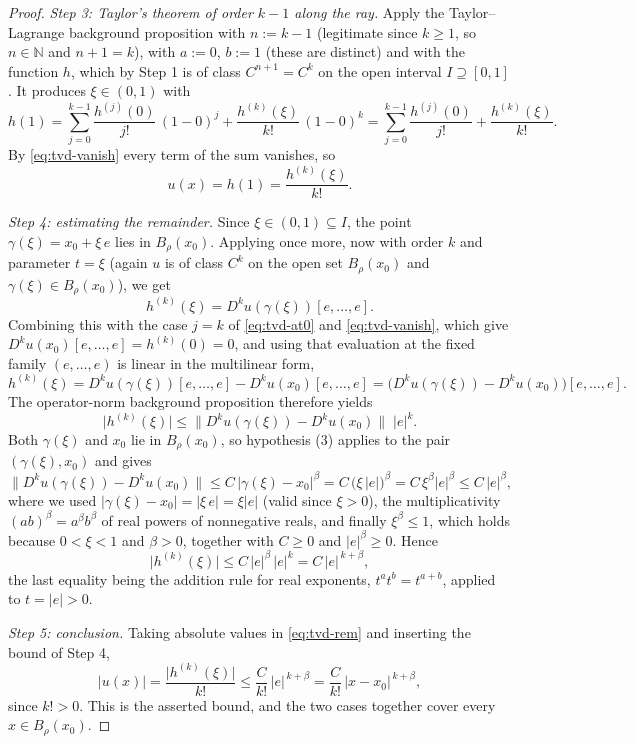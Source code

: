 \begin{proof}
\emph{Step 3: Taylor's theorem of order $k-1$ along the ray.}
Apply the Taylor--Lagrange background proposition with $n:=k-1$ (legitimate since $k\ge1$, so
$n\in\mathbb{N}$ and $n+1=k$), with $a:=0$, $b:=1$ (these are distinct) and with the function
$h$, which by Step 1 is of class $C^{n+1}=C^{k}$ on the open interval $I\supseteq[0,1]$.  It
produces $\xi\in(0,1)$ with
\[
  h(1)=\sum_{j=0}^{k-1}\frac{h^{(j)}(0)}{j!}\,(1-0)^{j}
       +\frac{h^{(k)}(\xi)}{k!}\,(1-0)^{k}
      =\sum_{j=0}^{k-1}\frac{h^{(j)}(0)}{j!}+\frac{h^{(k)}(\xi)}{k!} .
\]
By \eqref{eq:tvd-vanish} every term of the sum vanishes, so
\begin{equation}\label{eq:tvd-rem}
  u(x)=h(1)=\frac{h^{(k)}(\xi)}{k!} .
\end{equation}

\emph{Step 4: estimating the remainder.}
Since $\xi\in(0,1)\subseteq I$, the point $\gamma(\xi)=x_0+\xi\,e$ lies in $B_\rho(x_0)$.
Applying  once more, now with order $k$ and parameter
$t=\xi$ (again $u$ is of class $C^{k}$ on the open set $B_\rho(x_0)$ and
$\gamma(\xi)\in B_\rho(x_0)$), we get
\[
  h^{(k)}(\xi)=D^{k}u(\gamma(\xi))[e,\ldots,e].
\]
Combining this with the case $j=k$ of \eqref{eq:tvd-at0} and \eqref{eq:tvd-vanish}, which give
$D^{k}u(x_0)[e,\ldots,e]=h^{(k)}(0)=0$, and using that evaluation at the fixed family
$(e,\ldots,e)$ is linear in the multilinear form,
\[
  h^{(k)}(\xi)=D^{k}u(\gamma(\xi))[e,\ldots,e]-D^{k}u(x_0)[e,\ldots,e]
             =\bigl(D^{k}u(\gamma(\xi))-D^{k}u(x_0)\bigr)[e,\ldots,e].
\]
The operator-norm background proposition therefore yields
\[
  \bigl\lvert h^{(k)}(\xi)\bigr\rvert
  \le\bigl\lVert D^{k}u(\gamma(\xi))-D^{k}u(x_0)\bigr\rVert\;\lvert e\rvert^{k}.
\]
Both $\gamma(\xi)$ and $x_0$ lie in $B_\rho(x_0)$, so hypothesis (3) applies to the pair
$(\gamma(\xi),x_0)$ and gives
\[
  \bigl\lVert D^{k}u(\gamma(\xi))-D^{k}u(x_0)\bigr\rVert
  \le C\,\lvert\gamma(\xi)-x_0\rvert^{\beta}
  = C\,\bigl(\xi\,\lvert e\rvert\bigr)^{\beta}
  = C\,\xi^{\beta}\lvert e\rvert^{\beta}
  \le C\,\lvert e\rvert^{\beta},
\]
where we used $\lvert\gamma(\xi)-x_0\rvert=\lvert\xi\,e\rvert=\xi\lvert e\rvert$ (valid since
$\xi>0$), the multiplicativity $(ab)^{\beta}=a^{\beta}b^{\beta}$ of real powers of nonnegative
reals, and finally $\xi^{\beta}\le1$, which holds because $0<\xi<1$ and $\beta>0$, together
with $C\ge0$ and $\lvert e\rvert^{\beta}\ge0$.  Hence
\[
  \bigl\lvert h^{(k)}(\xi)\bigr\rvert
  \le C\,\lvert e\rvert^{\beta}\,\lvert e\rvert^{k}
  = C\,\lvert e\rvert^{\,k+\beta},
\]
the last equality being the addition rule for real exponents, $t^{a}t^{b}=t^{a+b}$, applied to
$t=\lvert e\rvert>0$.

\emph{Step 5: conclusion.}  Taking absolute values in \eqref{eq:tvd-rem} and inserting the
bound of Step 4,
\[
  \lvert u(x)\rvert=\frac{\bigl\lvert h^{(k)}(\xi)\bigr\rvert}{k!}
  \le\frac{C}{k!}\,\lvert e\rvert^{\,k+\beta}
  =\frac{C}{k!}\,\lvert x-x_0\rvert^{\,k+\beta},
\]
since $k!>0$.  This is the asserted bound, and the two cases together cover every
$x\in B_\rho(x_0)$.
\end{proof}
